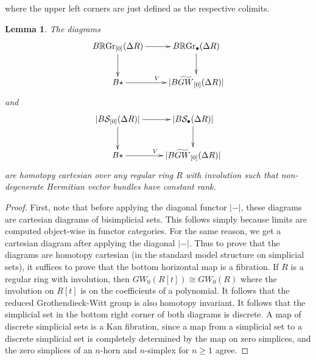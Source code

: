 \documentclass[edeposit,fullpage]{uiucthesis2009}
\newcommand{\Z}{\mathbb Z}
\newcommand{\mbb}{\mathbb}
\newcommand{\mc}{\mathcal}
\newcommand{\RGr}{\mathbb R\mathrm{Gr}}
\DeclareMathOperator*{\colim}{colim}
\theoremstyle{plain}
\newtheorem{lemma}{Lemma}
\numberwithin{lemma}{section}
\theoremstyle{definition}
\begin{document}
where the upper left corners are just defined as the respective colimits. 

\begin{lemma}
The diagrams
\[
\xymatrix{B\RGr_{[0]}(\Delta R) \ar[r]\ar[d] & B\RGr_\bullet(\Delta R) \ar[d] \\ B\star \ar[r]^V & |B\widetilde{GW}_{[0]}(\Delta R)|}
\]
and 
\[
\xymatrix{|B\mc S_{[0]}(\Delta R)| \ar[r]\ar[d] & |B\mc S_\bullet(\Delta R)| \ar[d] \\ B\star \ar[r]^V &
  |B\widetilde{GW}_{[0]}(\Delta R)|}
\]
are homotopy cartesian over any regular ring $R$ with involution such that
non-degenerate Hermitian vector bundles have constant rank.
\end{lemma}

\begin{proof}



First, note that before applying the diagonal functor $| - |$, these
diagrams are cartesian diagrams of bisimplicial sets. This follows
simply because limits are computed object-wise in functor
categories. For the same reason, we get a cartesian diagram after
applying the diagonal $| - |$. Thus to prove that the diagrams are homotopy
cartesian (in the standard model structure on simplicial sets), it
suffices to prove that the bottom horizontal map is a fibration. If $R$
is a regular ring with involution, then $GW_0(R[t]) \cong GW_0(R)$
where the involution on $R[t]$ is on the coefficients of a
polynomial. It follows that the reduced Grothendieck-Witt group is
also homotopy invariant. It follows that the simplicial set in the bottom right
corner of both diagrams is discrete. A map of discrete simplicial sets
is a Kan fibration, since a map from a simplicial set to a discrete
simplicial set is completely determined by the map on zero simplices,
and the zero simplices of an $n$-horn and $n$-simplex for $n \geq 1$ agree.
\end{proof}
\end{document}
